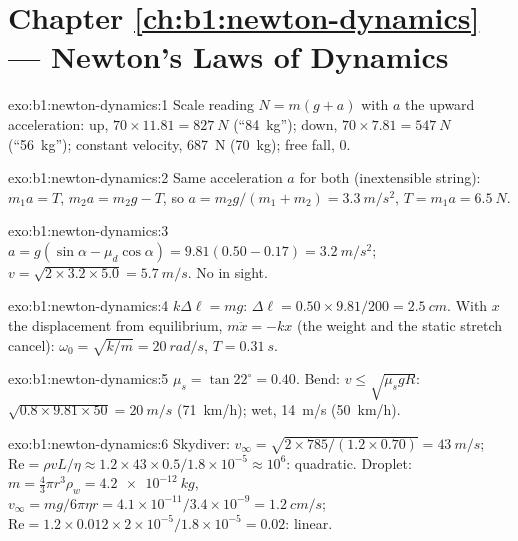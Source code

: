 \section*{Chapter \ref{ch:b1:newton-dynamics} --- Newton's Laws of Dynamics}

\begin{solution}{exo:b1:newton-dynamics:1}
Scale reading $N = m(g + a)$ with $a$ the upward acceleration: up,
$70 \times 11.81 = \qty{827}{N}$ (``\qty{84}{kg}''); down, $70 \times 7.81 =
\qty{547}{N}$ (``\qty{56}{kg}''); constant velocity, \qty{687}{N}
(\qty{70}{kg}); free fall, $0$.
\end{solution}

\begin{solution}{exo:b1:newton-dynamics:2}
Same acceleration $a$ for both (inextensible string): $m_1a = T$,
$m_2a = m_2g - T$, so $a = m_2g/(m_1 + m_2) = \qty{3.3}{m/s^2}$,
$T = m_1a = \qty{6.5}{N}$.
\end{solution}

\begin{solution}{exo:b1:newton-dynamics:3}
$a = g(\sin\alpha - \mu_d\cos\alpha) = 9.81(0.50 - 0.17) = \qty{3.2}{m/s^2}$;
$v = \sqrt{2 \times 3.2 \times 5.0} = \qty{5.7}{m/s}$. No  in sight.
\end{solution}

\begin{solution}{exo:b1:newton-dynamics:4}
$k\Delta\ell = mg$: $\Delta\ell = 0.50 \times 9.81/200 = \qty{2.5}{cm}$.
With $x$ the displacement from equilibrium, $m\ddot x = -kx$ (the weight
and the static stretch cancel): $\omega_0 = \sqrt{k/m} = \qty{20}{rad/s}$,
$T = \qty{0.31}{s}$.
\end{solution}

\begin{solution}{exo:b1:newton-dynamics:5}
$\mu_s = \tan 22^\circ = 0.40$. Bend: $v \leq \sqrt{\mu_sgR}$: $\sqrt{0.8
\times 9.81 \times 50} = \qty{20}{m/s}$ (\qty{71}{km/h}); wet,
\qty{14}{m/s} (\qty{50}{km/h}).
\end{solution}

\begin{solution}{exo:b1:newton-dynamics:6}
Skydiver: $v_\infty = \sqrt{2 \times 785/(1.2 \times 0.70)} = \qty{43}{m/s}$;
$\mathrm{Re} = \rho vL/\eta \approx 1.2 \times 43 \times 0.5/1.8\times10^{-5}
\approx 10^6$: quadratic. Droplet: $m = \tfrac43\pi r^3\rho_w = \qty{4.2e-12}{kg}$,
$v_\infty = mg/6\pi\eta r = 4.1\times10^{-11}/3.4\times10^{-9} = \qty{1.2}{cm/s}$;
$\mathrm{Re} = 1.2 \times 0.012 \times 2\times10^{-5}/1.8\times10^{-5} = 0.02$:
linear.
\end{solution}

